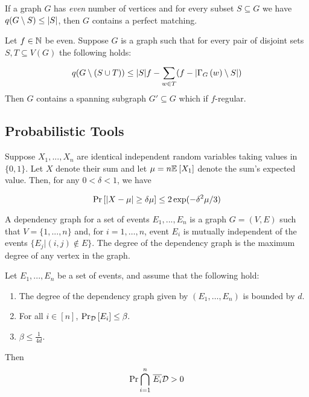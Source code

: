 \documentclass[11pt]{article}
\begin{document}
\begin{lemma}\label{lemma:tutte-criterion}
If a graph $G$ has  \emph{even} number of vertices and for every subset $S \subseteq G$ we have $q(G \setminus S) \leq |S|$, then $G$ contains a perfect matching.
\end{lemma}

\begin{lemma}\label{lemma:tutte-criterion-factor}
  Let $f \in \mathbb{N}$ be even. Suppose $G$ is a graph such that for every pair of disjoint sets $S, T \subseteq V(G)$ the following holds:

  \[ q(G \setminus (S \cup T)) \le |S|f - \sum_{w \in T} (f - |\Gamma_{G}\left(w\right) \setminus S|) \]
  Then $G$ contains a spanning subgraph $G' \subseteq G$ which if $f$-regular.
\end{lemma}


\newpage

\subsection{Probabilistic Tools}

\begin{lemma}\label{lemma:mult-chernoff}
Suppose $X_1, ..., X_n$ are identical independent random variables taking values in $\{0, 1\}$. Let $X$ denote their sum and let $\mu = n\mathbb{E}_{}\left[X_1\right]$ denote the sum's expected value. Then, for any $0 < \delta < 1$, we have

\[ \Pr\left[|X - \mu| \geq \delta \mu \right] \leq 2\exp(-\delta^2\mu/3)\]

\end{lemma}


A dependency graph for a set of events $E_1, . . . , E_n$ is a graph $G=(V, E)$ such that $V = \{1,.. . , n\}$ and,  for $i= 1,\dots, n$, event $E_i$ is mutually independent
of the events $\{E_j | (i, j) \notin E\}$. The degree of the dependency graph is the maximum degree of any vertex in the graph.


\begin{lemma}\label{lemma:lll}
Let $E_1,...,E_n$ be a set of events, and assume that the following hold:
\begin{enumerate}
\item The degree of the dependency graph given by $(E_1, \dots, E_n)$ is bounded by $d$.

\item For all $i \in [n]$, $\Pr_{\mathcal{D}}\left[E_i \right] \leq \beta.$

\item $\beta \leq \frac{1}{4d}$.
\end{enumerate}
Then
\[ \Pr{\overset{n}{ \underset{i=1}{\bigcap}} \hspace{0.1cm}  \overline{E_i}}{\mathcal{D}} > 0\]


\end{lemma}
\end{document}

